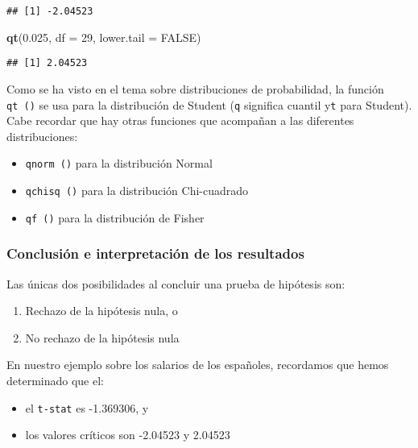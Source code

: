 \documentclass[
]{book}
\newenvironment{Shaded}{\begin{snugshade}}{\end{snugshade}}
\newcommand{\DataTypeTok}[1]{\textcolor[rgb]{0.13,0.29,0.53}{#1}}
\newcommand{\DecValTok}[1]{\textcolor[rgb]{0.00,0.00,0.81}{#1}}
\newcommand{\FloatTok}[1]{\textcolor[rgb]{0.00,0.00,0.81}{#1}}
\newcommand{\KeywordTok}[1]{\textcolor[rgb]{0.13,0.29,0.53}{\textbf{#1}}}
\newcommand{\NormalTok}[1]{#1}
\newcommand{\OtherTok}[1]{\textcolor[rgb]{0.56,0.35,0.01}{#1}}
\providecommand{\tightlist}{%
  \setlength{\itemsep}{0pt}\setlength{\parskip}{0pt}}
\begin{document}
\begin{verbatim}
## [1] -2.04523
\end{verbatim}

\begin{Shaded}
\begin{Highlighting}[]
\KeywordTok{qt}\NormalTok{(}\FloatTok{0.025}\NormalTok{, }\DataTypeTok{df =} \DecValTok{29}\NormalTok{, }\DataTypeTok{lower.tail =} \OtherTok{FALSE}\NormalTok{)}
\end{Highlighting}
\end{Shaded}

\begin{verbatim}
## [1] 2.04523
\end{verbatim}

Como se ha visto en el tema sobre distribuciones de probabilidad, la función \texttt{qt\ ()} se usa para la distribución de Student (\texttt{q} significa cuantil y\texttt{t} para Student). Cabe recordar que hay otras funciones que acompañan a las diferentes distribuciones:

\begin{itemize}
\tightlist
\item
  \texttt{qnorm\ ()} para la distribución Normal
\item
  \texttt{qchisq\ ()} para la distribución Chi-cuadrado
\item
  \texttt{qf\ ()} para la distribución de Fisher
\end{itemize}

\hypertarget{conclusiuxf3n-e-interpretaciuxf3n-de-los-resultados}{%
\subsubsection{Conclusión e interpretación de los resultados}\label{conclusiuxf3n-e-interpretaciuxf3n-de-los-resultados}}

Las únicas dos posibilidades al concluir una prueba de hipótesis son:

\begin{enumerate}
\def\labelenumi{\arabic{enumi}.}
\tightlist
\item
  Rechazo de la hipótesis nula, o
\item
  No rechazo de la hipótesis nula
\end{enumerate}

En nuestro ejemplo sobre los salarios de los españoles, recordamos que hemos determinado que el:

\begin{itemize}
\tightlist
\item
  el \texttt{t-stat} es -1.369306, y
\item
  los valores críticos son -2.04523 y 2.04523
\end{itemize}
\end{document}
